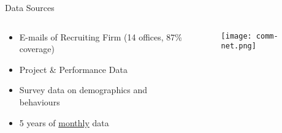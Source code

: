 \begin{frame}{{\color{violet}Data Sources}}

  \begin{columns}

    \begin{column}{0.5\linewidth}

      \begin{itemize}
        \item E-mails of Recruiting Firm (14 offices, 87\% coverage)
        \item Project \& Performance Data
        \item Survey data on demographics and behaviours
        \item 5 years of \underline{monthly} data 
      \end{itemize}

    \end{column}

    \begin{column}{0.5\linewidth}
      \begin{figure}
        \centering
        \texttt{[image: comm-net.png]}
      \end{figure}
    \end{column}
    
  \end{columns}

  \note{
    
  }

\end{frame}
